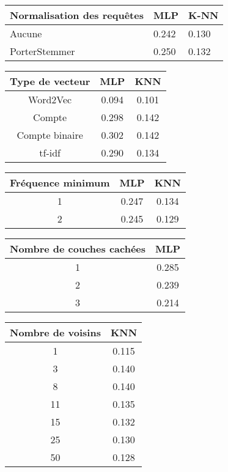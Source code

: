 \begin{center}
\begin{tabular}{|l|l|l|}
\hline
\textbf{Normalisation des requêtes} & MLP & K-NN \\ \hline
Aucune                     & 0.242                  & 0.130                  \\ \hline
PorterStemmer              & 0.250                  & 0.132                  \\ \hline
\end{tabular}
\end{center}

\begin{center}
\begin{tabular}{|c|c|c|}
\hline
\textbf{Type de vecteur} & MLP & KNN \\ \hline
Word2Vec & 0.094 & 0.101 \\ \hline
Compte & 0.298 & 0.142 \\ \hline
Compte binaire & 0.302 & 0.142 \\ \hline
tf-idf & 0.290 & 0.134 \\ \hline
\end{tabular}
\end{center}

\begin{center}
\begin{tabular}{|c|c|c|}
\hline
\textbf{Fréquence minimum} & MLP & KNN \\ \hline
1 & 0.247 & 0.134 \\ \hline
2 & 0.245 & 0.129 \\ \hline
\end{tabular}
\end{center}

\begin{center}
\begin{tabular}{|c|c|}
\hline
\textbf{Nombre de couches cachées} & MLP \\ \hline
1 & 0.285 \\ \hline
2 & 0.239 \\ \hline
3 & 0.214 \\ \hline
\end{tabular}
\end{center}


\begin{center}
\begin{tabular}{|c|c|}
\hline
\textbf{Nombre de voisins} & KNN \\ \hline
1 & 0.115 \\ \hline
3 & 0.140 \\ \hline
8 & 0.140 \\ \hline
11 & 0.135 \\ \hline
15 & 0.132 \\ \hline
25 & 0.130 \\ \hline
50 & 0.128 \\ \hline
\end{tabular}
\end{center}

